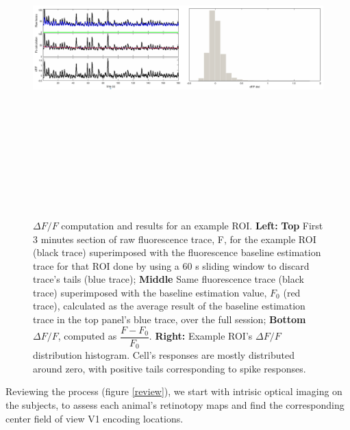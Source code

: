 \begin{figure}[H] \centering \includegraphics[width=13cm,height=13cm,keepaspectratio]{Figures/7.Results/ftraces/dFoverF.png} 
\caption{$\Delta F/F$ computation and results for an example ROI.
\newline \textbf{Left:} \textbf{Top} First 3 minutes section of raw fluorescence trace, F, for the example ROI (black trace) superimposed with the fluorescence baseline estimation trace for that ROI done by using a 60 s sliding window to discard trace's tails (blue trace); \textbf{Middle} Same fluorescence trace (black trace) superimposed with the baseline estimation value, $F_0$ (red trace), calculated as the average result of the baseline estimation trace in the top panel's blue trace, over the full session; \textbf{Bottom} $\Delta F/F$, computed as $\dfrac{F-F_0}{F_0}$.
\newline \textbf{Right:} Example ROI's $\Delta F/F$ distribution histogram. Cell's responses are mostly distributed around zero, with positive tails corresponding to spike responses.
\label{dfoverf}}
\end{figure}

Reviewing the process (figure \ref{review}), we start with intrisic optical imaging on the subjects, to assess each animal's retinotopy maps and find the corresponding center field of view V1 encoding locations. 

